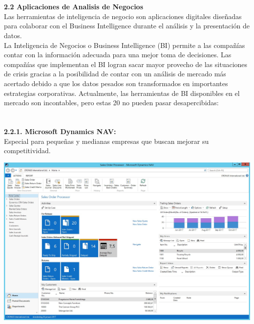 \begin{flushleft}
\textbf{}\\
\textbf{}\\

\textbf{2.2 Aplicaciones de Analisis de Negocios}\\
Las herramientas de inteligencia de negocio son aplicaciones digitales diseñadas para colaborar con el Business Intelligence durante el análisis y la presentación de datos.\\
La Inteligencia de Negocios o Business Intelligence (BI) permite a las compañías contar con la información adecuada para una mejor toma de decisiones.  Las compañías que implementan el BI logran sacar mayor provecho de las situaciones de crisis gracias a la posibilidad de contar con un análisis de mercado más acertado debido a que los datos pesados son transformados en importantes estrategias corporativas.
Actualmente, las herramientas de BI disponibles en el mercado son incontables, pero estas 20 no pueden pasar desapercibidas:
\textbf{}\\
\textbf{}\\
\textbf{}\\

\textbf{2.2.1. Microsoft Dynamics NAV: }\\
Especial para pequeñas y medianas empresas que buscan mejorar su competitividad.
	\begin{center}
	\includegraphics[width=15cm]{./Imagenes/BIimagen1}
	\end{center}
	

\end{flushleft}
